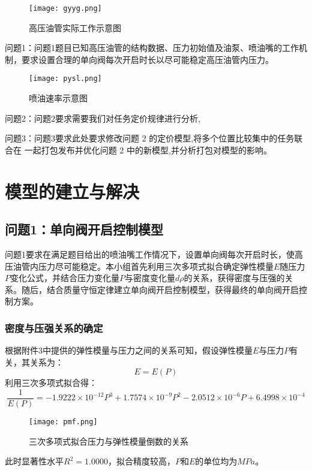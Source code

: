 \documentclass{cumcmthesis}
\begin{document}
\begin{figure}[!htp]
	\centering
	\texttt{[image: gyyg.png]}
	\caption{高压油管实际工作示意图}
	\label{1}
\end{figure}

问题1：问题1题目已知高压油管的结构数据、压力初始值及油泵、喷油嘴的工作机制，要求设置合理的单向阀每次开启时长以尽可能稳定高压油管内压力。
\begin{figure}[!htp]
	\centering
	\texttt{[image: pysl.png]}
	\caption{喷油速率示意图}
	\label{2}
\end{figure}

问题2：问题2要求需要我们对任务定价规律进行分析,

问题3：问题3要求此处要求修改问题 2 的定价模型,将多个位置比较集中的任务联合在 一起打包发布并优化问题 2 中的新模型,并分析打包对模型的影响。 

\section{模型的建立与解决}
\subsection{问题1：单向阀开启控制模型}
问题1要求在满足题目给出的喷油嘴工作情况下，设置单向阀每次开启时长，使高压油管内压力尽可能稳定。本小组首先利用三次多项式拟合确定弹性模量$E$随压力$P$变化公式，并结合压力变化量$P$与密度变化量$d\rho$的关系，获得密度与压强的关系。随后，结合质量守恒定律建立单向阀开启控制模型，获得最终的单向阀开启控制方案。
\subsubsection{密度与压强关系的确定}
根据附件3中提供的弹性模量与压力之间的关系可知，假设弹性模量$E$与压力$P$有关，其关系为：
	\begin{equation}
		E=E(P)
	\end{equation}
利用三次多项式拟合得：
\begin{equation}
\frac{1}{E(P)}=-1.9222 \times 10^{-12}P^{3}+1.7574\times 10^{-9}P^{2}-2.0512\times 10^{-6}P+6.4998\times 10^{-4}
\end{equation}
\begin{figure}[!htp]
	\centering
	\texttt{[image: pmf.png]}
	\caption{三次多项式拟合压力与弹性模量倒数的关系}
	\label{3}
\end{figure}
此时显著性水平$R^{2}=1.0000$，拟合精度较高，$P$和$E$的单位均为$MPa$。
\end{document}
